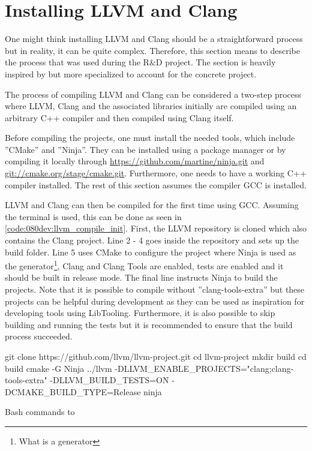 \section{Installing LLVM and Clang}
One might think installing LLVM and Clang should be a straightforward process but in reality, it can be quite complex. Therefore, this section means to describe the process that was used during the R\&D project. The section is heavily inspired by \cite{TutorialBuildingTools} but more specialized to account for the concrete project.

The process of compiling LLVM and Clang can be considered a two-step process where LLVM, Clang and the associated libraries initially are compiled using an arbitrary C++ compiler and then compiled using Clang itself.

Before compiling the projects, one must install the needed tools, which include ''CMake'' and ''Ninja''. They can be installed using a package manager or by compiling it locally through \url{https://github.com/martine/ninja.git} and \url{git://cmake.org/stage/cmake.git}. Furthermore, one needs to have a working C++ compiler installed. The rest of this section assumes the compiler GCC is installed.


LLVM and Clang can then be compiled for the first time using GCC. Assuming the terminal is used, this can be done as seen in \cref{code:080dev:llvm_compile_init}.
First, the LLVM repository is cloned which also contains the Clang project.
Line 2 - 4 goes inside the repository and sets up the build folder.
Line 5 uses CMake to configure the project where Ninja is used as the generator\footnote{What is a generator}, Clang and Clang Tools are enabled, tests are enabled and it should be built in release mode. The final line instructs Ninja to build the projects. Note that it is possible to compile without ''clang-tools-extra'' but these projects can be helpful during development as they can be used as inspiration for developing tools using LibTooling. Furthermore, it is also possible to skip building and running the tests but it is recommended to ensure that the build process succeeded.

\begin{listing}[H]
    \begin{bashcode}
git clone https://github.com/llvm/llvm-project.git
cd llvm-project
mkdir build
cd build
cmake -G Ninja ../llvm -DLLVM_ENABLE_PROJECTS="clang;clang-tools-extra" -DLLVM_BUILD_TESTS=ON -DCMAKE_BUILD_TYPE=Release
ninja
    \end{bashcode}
    \caption{Bash commands to }
    \label{code:080dev:llvm_compile_init}
\end{listing}

